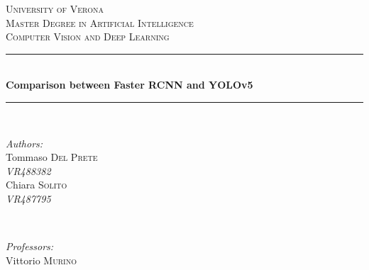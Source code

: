\begin{titlepage}

\newcommand{\HRule}{\rule{\linewidth}{0.5mm}} %

\center %
 

\textsc{\LARGE University of Verona}\\[1.5cm] %
\textsc{\Large Master Degree in Artificial Intelligence}\\[0.5cm] %
\textsc{\large Computer Vision and Deep Learning}\\[0.5cm] %


\HRule \\[0.4cm]
{ \huge \bfseries Comparison between Faster RCNN and YOLOv5}\\[0.4cm] %
\HRule \\[1.5cm]
 

\begin{minipage}{0.4\textwidth}
\begin{flushleft} \large
\emph{Authors:}\\
\vspace{5mm}
Tommaso \textsc{Del Prete}\\ \textit{VR488382} \\
\vspace{5mm}
Chiara \textsc{Solito}\\ \textit{VR487795}
\end{flushleft}
\end{minipage}
~
\begin{minipage}{0.4\textwidth}
\begin{flushright} \large
\emph{Professors:}\\
\vspace{5mm}
Vittorio \textsc{Murino}
\end{flushright}
\end{minipage}\\[2cm]


\end{titlepage}
